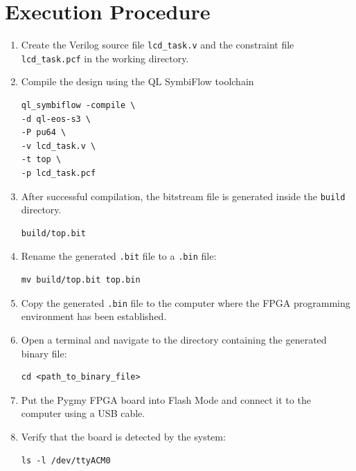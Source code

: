 \documentclass[12pt,a4paper]{article}
\begin{document}
\section*{Execution Procedure}

\begin{enumerate}

\item Create the Verilog source file \texttt{lcd_task.v} and the constraint file \texttt{lcd_task.pcf} in the working directory.

\item Compile the design using the QL SymbiFlow toolchain

\begin{verbatim}
ql_symbiflow -compile \
-d ql-eos-s3 \
-P pu64 \
-v lcd_task.v \
-t top \
-p lcd_task.pcf
\end{verbatim}

\item After successful compilation, the bitstream file is generated inside the \texttt{build} directory.

\begin{verbatim}
build/top.bit
\end{verbatim}

\item Rename the generated \texttt{.bit} file to a \texttt{.bin} file:

\begin{verbatim}
mv build/top.bit top.bin
\end{verbatim}

\item Copy the generated \texttt{.bin} file to the computer where the FPGA programming environment has been established.

\item Open a terminal and navigate to the directory containing the generated binary file:

\begin{verbatim}
cd <path_to_binary_file>
\end{verbatim}

\item Put the Pygmy FPGA board into Flash Mode and connect it to the computer using a USB cable.

\item Verify that the board is detected by the system:

\begin{verbatim}
ls -l /dev/ttyACM0
\end{verbatim}


\end{enumerate}
\end{document}
